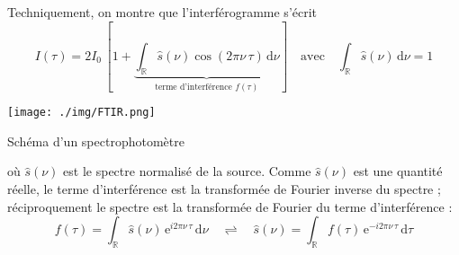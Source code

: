 Techniquement, on montre que l'interférogramme  s'écrit
\[
	I(\tau)=2I_0\,[1+\underbrace{\int_{\mathbb{R}}\widehat{s}(\nu)\cos(2\pi\nu\, \tau)\, \mathrm{d}\nu}_{\text{terme d'interférence }f(\tau)}]
	\quad\text{avec}\quad
	\int_{\mathbb{R}}\widehat{s}(\nu)\, \mathrm{d}\nu=1
\]
\begin{marginfigure}
\centering
\texttt{[image: ./img/FTIR.png]}
\caption{Schéma d'un spectrophotomètre}
\end{marginfigure}
où \(\widehat{s}(\nu)\) est le spectre normalisé de la source. Comme \(\widehat{s}(\nu)\) est une quantité réelle, le terme d'interférence est la transformée de Fourier inverse du spectre ; réciproquement le spectre est la transformée de Fourier du terme d'interférence :
\[
	f(\tau)=\int_{\mathbb{R}}\widehat{s}(\nu)\,\mathrm{e}^{i2\pi \nu \, \tau}\, \mathrm{d}\nu
	\quad\rightleftharpoons\quad
	\widehat{s}(\nu)=\int_{\mathbb{R}}f(\tau)\,\mathrm{e}^{-i2\pi \nu \, \tau}\, \mathrm{d}\tau
\]
